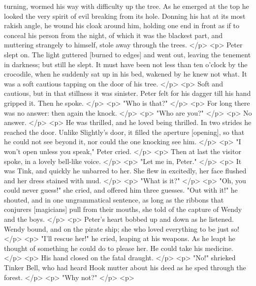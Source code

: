       turning, wormed his way with difficulty up the tree. As he emerged at the
      top he looked the very spirit of evil breaking from its hole. Donning his
      hat at its most rakish angle, he wound his cloak around him, holding one
      end in front as if to conceal his person from the night, of which it was
      the blackest part, and muttering strangely to himself, stole away through
      the trees.
    </p>
    <p>
      Peter slept on. The light guttered [burned to edges] and went out, leaving
      the tenement in darkness; but still he slept. It must have been not less
      than ten o'clock by the crocodile, when he suddenly sat up in his bed,
      wakened by he knew not what. It was a soft cautious tapping on the door of
      his tree.
    </p>
    <p>
      Soft and cautious, but in that stillness it was sinister. Peter felt for
      his dagger till his hand gripped it. Then he spoke.
    </p>
    <p>
      "Who is that?"
    </p>
    <p>
      For long there was no answer: then again the knock.
    </p>
    <p>
      "Who are you?"
    </p>
    <p>
      No answer.
    </p>
    <p>
      He was thrilled, and he loved being thrilled. In two strides he reached
      the door. Unlike Slightly's door, it filled the aperture [opening], so
      that he could not see beyond it, nor could the one knocking see him.
    </p>
    <p>
      "I won't open unless you speak," Peter cried.
    </p>
    <p>
      Then at last the visitor spoke, in a lovely bell-like voice.
    </p>
    <p>
      "Let me in, Peter."
    </p>
    <p>
      It was Tink, and quickly he unbarred to her. She flew in excitedly, her
      face flushed and her dress stained with mud.
    </p>
    <p>
      "What is it?"
    </p>
    <p>
      "Oh, you could never guess!" she cried, and offered him three guesses.
      "Out with it!" he shouted, and in one ungrammatical sentence, as long as
      the ribbons that conjurers [magicians] pull from their mouths, she told of
      the capture of Wendy and the boys.
    </p>
    <p>
      Peter's heart bobbed up and down as he listened. Wendy bound, and on the
      pirate ship; she who loved everything to be just so!
    </p>
    <p>
      "I'll rescue her!" he cried, leaping at his weapons. As he leapt he
      thought of something he could do to please her. He could take his
      medicine.
    </p>
    <p>
      His hand closed on the fatal draught.
    </p>
    <p>
      "No!" shrieked Tinker Bell, who had heard Hook mutter about his deed as he
      sped through the forest.
    </p>
    <p>
      "Why not?"
    </p>
    <p>
